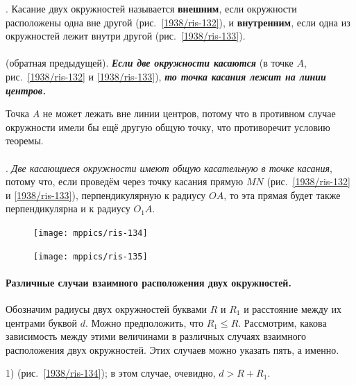 \documentclass[oneside]{book}
\begin{document}
.
Касание двух окружностей называется \textbf{внешним}, если окружности расположены одна вне другой (рис.~\ref{1938/ris-132}), и \textbf{внутренним}, если одна из окружностей лежит внутри другой (рис.~\ref{1938/ris-133}).

\paragraph{}\label{1938/120}
 (обратная предыдущей).
\textbf{\emph{Если две окружности касаются}} (в точке $A$, рис.~\ref{1938/ris-132} и \ref{1938/ris-133}), \textbf{\emph{то точка касания лежит на линии центров.}}

Точка $A$ не может лежать вне линии центров, потому что в противном случае окружности имели бы ещё другую общую точку, что противоречит условию теоремы. %

\paragraph{}\label{1938/121}
.
\emph{Две касающиеся окружности имеют общую касательную в точке касания}, потому что, если проведём через точку касания прямую $MN$ (рис.~\ref{1938/ris-132} и \ref{1938/ris-133}), перпендикулярную к радиусу $OA$, то эта прямая будет также перпендикулярна и к радиусу $O_1A$.

\begin{figure}[h!]
\begin{minipage}{.48\textwidth}
\centering
\texttt{[image: mppics/ris-134]}
\caption{}\label{1938/ris-134}
\end{minipage}
\hfill
\begin{minipage}{.48\textwidth}
\centering
\texttt{[image: mppics/ris-135]}
\caption{}\label{1938/ris-135}
\end{minipage}
\end{figure}

\paragraph{Различные случаи взаимного расположения двух окружностей.}\label{1938/122}
Обозначим радиусы двух окружностей буквами $R$ и $R_1$ и расстояние между их центрами буквой $d$.
Можно предположить, что $R_1\le R$.
Рассмотрим, какова зависимость между этими величинами в различных случаях взаимного расположения двух окружностей.
Этих случаев можно указать пять, а именно.

1)  (рис.~\ref{1938/ris-134});
в этом случае, очевидно, $d>R+R_1$.
\end{document}
